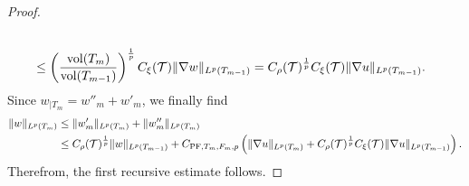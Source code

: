 \documentclass[10pt,a4paper]{article}
\begin{document}
\begin{proof}
\begin{align*}
        \\&
        \leq 
        \left( \frac{ \operatorname{vol}(T_m) }{ \operatorname{vol}(T_{m-1}) } \right)^{\frac 1 p}
        C_\xi({\mathcal T})
        \| \nabla w \|_{L^{p}(T_{m-1})}
        =
        C_\rho({\mathcal T})^{\frac 1 p} C_\xi({\mathcal T})
        \| \nabla u \|_{L^{p}(T_{m-1})}
        .
    \end{align*}
    Since $w_{|T_{m}} = w''_{m} + w'_{m}$, we finally find 
    \begin{align*}
        \| w \|_{L^{p}(T_{m})}
        &
        \leq  
        \| w'_{m} \|_{L^{p}(T_{m})}
        + 
        \| w''_{m} \|_{L^{p}(T_{m})}
        \\&
        \leq  
        C_\rho({\mathcal T})^{\frac 1 p} 
        \| w \|_{L^{p}(T_{m-1})} 
        + 
        C_{{\rm PF},T_{m},F_{m},p} 
        \left( 
            \| \nabla u \|_{L^{p}(T_{m})} 
            + 
            C_\rho({\mathcal T})^{\frac 1 p} C_\xi({\mathcal T})
        \| \nabla u \|_{L^{p}(T_{m-1})}
        \right). 
    \end{align*}
    Therefrom, the first recursive estimate follows.
    

\end{proof}
\end{document}
